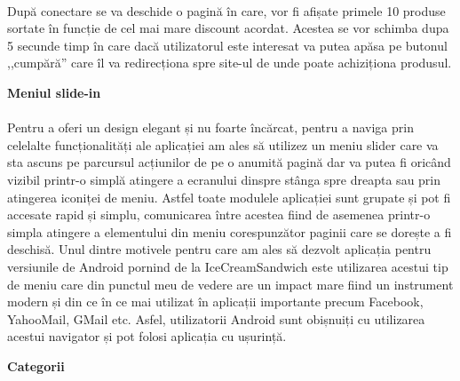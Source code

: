 \paragraph{ }După conectare se va deschide o pagină în care, vor fi afișate primele 10 produse sortate în funcție de cel mai mare discount acordat. Acestea se vor schimba dupa 5 secunde timp în care dacă utilizatorul este interesat va putea apăsa pe butonul ,,cumpără'' care îl va redirecționa spre site-ul de unde poate achiziționa produsul.

\textbf{Meniul slide-in}
\paragraph{ }Pentru a oferi un design elegant și nu foarte încărcat, pentru a naviga prin celelalte funcționalități ale aplicației am ales să utilizez un meniu slider care va sta ascuns pe parcursul acțiunilor de pe o anumită pagină dar va putea fi oricând vizibil printr-o simplă atingere a ecranului dinspre stânga spre dreapta sau prin atingerea iconiței de meniu. Astfel toate modulele aplicației sunt grupate și pot fi accesate rapid și simplu, comunicarea între acestea fiind de asemenea printr-o simpla atingere a elementului din meniu corespunzător paginii care se dorește a fi deschisă.
Unul dintre motivele pentru care am ales să dezvolt aplicația pentru versiunile de Android pornind de la IceCreamSandwich este utilizarea acestui tip de meniu care din punctul meu de vedere are un impact mare fiind un instrument modern și din ce în ce mai utilizat în aplicații importante precum Facebook, YahooMail, GMail etc. Asfel, utilizatorii Android sunt obișnuiți cu utilizarea acestui navigator și pot folosi aplicația cu ușurință. 

\textbf{Categorii}
